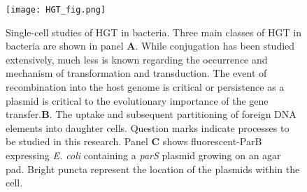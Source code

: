 \documentclass[letterpaper]{article}
\begin{document}
\begin{figure}[!h]
	\centerline{
		\texttt{[image: HGT\_fig.png]}}
	\caption{{\small Single-cell studies of HGT in bacteria. Three main
		classes of HGT in bacteria are shown in panel \textbf{A}. While
		conjugation has been studied extensively, much less is known
		regarding the occurrence and mechanism of transformation and
		transduction. The event of recombination into the host genome is
		critical or persistence as a plasmid is critical to the
		evolutionary importance of the gene transfer.\textbf{B}.
		The uptake and subsequent partitioning of foreign DNA elements
		into daughter cells. Question marks indicate processes to be
		studied in this research. Panel \textbf{C} shows
		fluorescent-ParB expressing \textit{E. coli} containing a
		\textit{parS} plasmid growing on an agar pad.  Bright puncta
		represent the location of the plasmids within the cell.}}
\end{figure}
\end{document}
